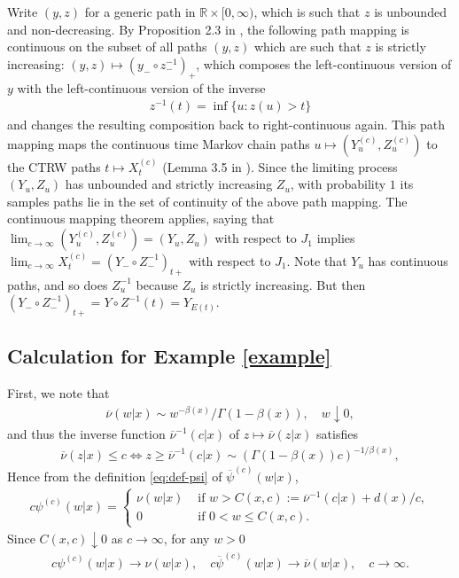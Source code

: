 \documentclass[a4paper,12pt]{elsarticle}
\numberwithin{equation}{section}
\theoremstyle{plain}
\theoremstyle{definition}
\theoremstyle{remark}
\numberwithin{equation}{section}
\newcommand{\spc}{\mathbb R}
\newcommand{\spctim}{\spc \times [0,\infty)}
\newcommand{\1}{\mathbf 1}
\begin{document}
Write $(y,z)$ for a generic path in $\spctim$, which is such that 
$z$ is unbounded and non-decreasing.
By Proposition 2.3 in \cite{StrakaHenry}, the following path mapping is 
continuous on the subset of all paths $(y,z)$ which are such that $z$ is 
strictly increasing: 
$(y,z) \mapsto (y_- \circ z^{-1}_-)_+$, which composes the left-continuous 
version of $y$ with the left-continuous version of the inverse 
\begin{align}
  z^{-1}(t) = \inf\{u: z(u) > t\}
\end{align}
and changes the resulting composition back to right-continuous again. 
This path mapping maps the continuous time Markov chain paths 
$u \mapsto (Y^{(c)}_u, Z^{(c)}_u)$ to the CTRW paths 
$t \mapsto X^{(c)}_t$ (Lemma 3.5 in \cite{StrakaHenry}). 
Since the limiting process $(Y_u, Z_u)$ has unbounded and strictly increasing 
$Z_u$, with probability $1$ its samples paths lie in the set of continuity of 
the above path mapping. 
The continuous mapping theorem \cite{Billingsley1968} applies, saying that 
$\lim_{c \to \infty}(Y^{(c)}_u, Z^{(c)}_u) = (Y_u, Z_u)$ with respect to $J_1$
implies
$\lim_{c \to \infty} X^{(c)}_t = (Y_- \circ Z^{-1}_-)_{t+}$ with respect to $J_1$. 
Note that $Y_u$ has continuous paths, and so does $Z^{-1}_u$ because 
$Z_u$ is strictly increasing. But then 
$(Y_- \circ Z^{-1}_-)_{t+} = Y \circ Z^{-1} (t) = Y_{E(t)}$. 


\subsection{Calculation for Example \ref{example}}
\label{subsec:calc-for-example}

First, we note that 
\begin{align}
  \overline \nu(w|x) \sim w^{-\beta(x)} / \Gamma(1-\beta(x)), 
  \quad w \downarrow 0, 
\end{align}
and thus the inverse function ${\overline \nu}^{-1}(c|x)$ of 
$z \mapsto \overline \nu(z|x)$ satisfies
\begin{align}
  \overline \nu(z | x) \le c
  \Leftrightarrow z \ge {\overline \nu}^{-1}(c|x)
  \sim (\Gamma(1-\beta(x))c)^{-1/\beta(x)},
\end{align}
Hence from the definition \eqref{eq:def-psi} of $\overline \psi^{(c)}(w|x)$, 
\begin{align}
\label{eq:psi-c}
  c \psi^{(c)}(w|x) = \begin{cases}
  \nu(w | x) & \text{ if } w > C(x,c) 
  := {\overline \nu}^{-1}(c|x) + d(x)/c, 
  \\
  0 & \text{ if } 0 < w \le C(x,c). 
  \end{cases}
\end{align}
Since $C(x,c) \downarrow 0$ as $c \to \infty$, for any $w > 0$
\begin{align} \label{eq:non-local-psi}
c \psi^{(c)}(w|x) \to \nu(w|x),
\quad 
  c \overline \psi^{(c)}(w|x) \to \overline \nu(w|x), \quad c \to \infty. 
\end{align}
\end{document}
